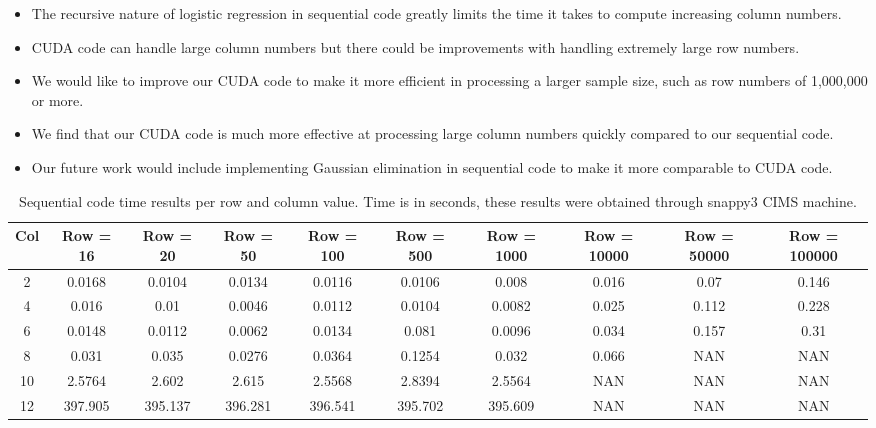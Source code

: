 \documentclass[letterpaper, 10 pt, conference]{ieeeconf}  %
\begin{document}
\begin{itemize}

\item The recursive nature of logistic regression in sequential code greatly limits the time it takes to compute increasing column numbers. 
\item CUDA code can handle large column numbers but there could be improvements with handling extremely large row numbers.
\item We would like to improve our CUDA code to make it more efficient in processing a larger sample size, such as row numbers of 1,000,000 or more.
\item We find that our CUDA code is much more effective at processing large column numbers quickly compared to our sequential code.
\item Our future work would include implementing Gaussian elimination in sequential code to make it more comparable to CUDA code.
\end{itemize}






\begin{table}[h]
\centering
\begin{center}
\begin{tabular}{|c|c|c|c|c|c|c|c|c|c|}
\hline
Col & Row = 16 & Row = 20 & Row = 50 & Row = 100 & Row = 500 & Row = 1000 & Row = 10000 & Row = 50000 & Row = 100000\\
\hline
2 & 0.0168 & 0.0104 & 0.0134 & 0.0116 & 0.0106 & 0.008 & 0.016 & 0.07 & 0.146 \\
\hline
4 & 0.016 & 0.01 & 0.0046 & 0.0112 & 0.0104 & 0.0082 & 0.025 & 0.112 & 0.228 \\
\hline
6 & 0.0148 & 0.0112 & 0.0062 & 0.0134 & 0.081 & 0.0096 & 0.034 & 0.157 & 0.31 \\
\hline
8 & 0.031 & 0.035 & 0.0276 & 0.0364 & 0.1254 & 0.032 & 0.066 & NAN & NAN \\
\hline
10 & 2.5764 & 2.602 & 2.615 & 2.5568 & 2.8394 & 2.5564 & NAN & NAN & NAN \\
\hline
12 & 397.905 & 395.137 & 396.281 & 396.541 & 395.702 & 395.609 & NAN & NAN & NAN \\
\hline
\end{tabular}
\caption{Sequential code time results per row and column value. Time is in seconds, these results were obtained through snappy3 CIMS machine.}
\label{sequential}
\end{center}
\end{table}
\end{document}
